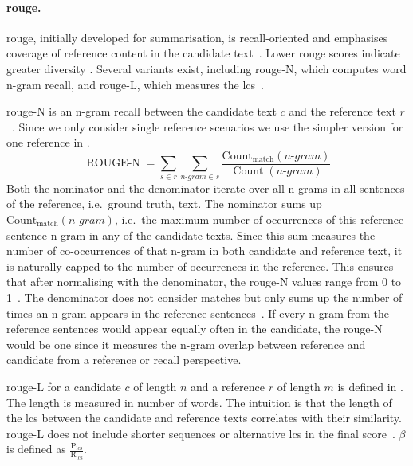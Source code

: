 
\paragraph{\ac{rouge}.}
\ac{rouge}, initially developed for summarisation, is recall-oriented and emphasises coverage of reference content in the candidate text~\citep{lin_rouge_2004}. 
Lower \ac{rouge} scores indicate greater diversity \citep{kurt_pehlivanoglu_comparative_2024}.
Several variants exist, including \ac{rouge}-N, which computes word n-gram recall, and \ac{rouge}-L, which measures the \ac{lcs}~\citep{zhou_paraphrase_2021,palivela_optimization_2021,kurt_pehlivanoglu_comparative_2024}. 

\ac{rouge}-N is an n-gram recall between the candidate text $c$ and the reference text $r$~\citep{lin_rouge_2004}.
Since we only consider single reference scenarios we use the simpler version for one reference in .
\begin{equation}
    \operatorname{ROUGE-N} = \sum_{s \in r}\sum_{n \text{-} gram \in s} \frac{\operatorname{Count_{match}}(n \text{-} gram)}{\operatorname{Count}(n \text{-} gram)}
\label{eq:rouge_n}
\end{equation}
Both the nominator and the denominator iterate over all n-grams in all sentences of the reference, i.e.\ ground truth, text.
The nominator sums up $\operatorname{Count_{match}}(n \text{-} gram)$, i.e.\ the maximum number of occurrences of this reference sentence n-gram in any of the candidate texts.
Since this sum measures the number of co-occurrences of that n-gram in both candidate and reference text, it is naturally capped to the number of occurrences in the reference.
This ensures that after normalising with the denominator, the \ac{rouge}-N values range from 0 to 1~\citep{kurt_pehlivanoglu_comparative_2024}.
The denominator does not consider matches but only sums up the number of times an n-gram appears in the reference sentences~\citep{lin_rouge_2004}.
If every n-gram from the reference sentences would appear equally often in the candidate, the \ac{rouge}-N would be one since it measures the n-gram overlap between reference and candidate from a reference or recall perspective.

\ac{rouge}-L for a candidate $c$ of length $n$ and a reference $r$ of length $m$ is defined in .
The length is measured in number of words.
The intuition is that the length of the \ac{lcs} between the candidate and reference texts correlates with their similarity.
\ac{rouge}-L does not include shorter sequences or alternative \ac{lcs} in the final score~\citep{lin_rouge_2004}.
$\beta$ is defined as $\frac{\mathrm{P_{lcs}}}{\mathrm{R_{lcs}}}$.

